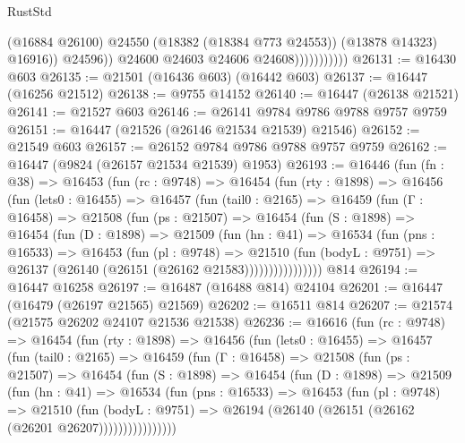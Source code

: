 \begin{lexlean}{RustStd}
\begin{coremodule}
                                  (@16884 @26100)
                                  @24550
                                  (@18382 (@18384 @773 @24553))
                                  (@13878 @14323)
                                  @16916))
                              @24596))
                          @24600
                          @24603
                          @24606
                          @24608)))))))))))
@26131 := @16430 @603
@26135 := @21501 (@16436 @603) (@16442 @603)
@26137 := @16447 (@16256 @21512)
@26138 := @9755 @14152
@26140 := @16447 (@26138 @21521)
@26141 := @21527 @603
@26146 := @26141 @9784 @9786 @9788 @9757 @9759
@26151 := @16447 (@21526 (@26146 @21534 @21539) @21546)
@26152 := @21549 @603
@26157 := @26152 @9784 @9786 @9788 @9757 @9759
@26162 := @16447 (@9824 (@26157 @21534 @21539) @1953)
@26193 := @16446
    (fun (fn : @38) =>
    @16453
      (fun (rc : @9748) =>
      @16454
        (fun (rty : @1898) =>
        @16456
          (fun (lets0 : @16455) =>
          @16457
            (fun (tail0 : @2165) =>
            @16459
              (fun (Γ : @16458) =>
              @21508
                (fun (ps : @21507) =>
                @16454
                  (fun (S : @1898) =>
                  @16454
                    (fun (D : @1898) =>
                    @21509
                      (fun (hn : @41) =>
                      @16534
                        (fun (pns : @16533) =>
                        @16453
                          (fun (pl : @9748) =>
                          @21510
                            (fun (bodyL : @9751) =>
                            @26137 (@26140 (@26151 (@26162 @21583))))))))))))))))
    @814
@26194 := @16447 @16258
@26197 := @16487 (@16488 @814) @24104
@26201 := @16447 (@16479 (@26197 @21565) @21569)
@26202 := @16511 @814
@26207 := @21574 (@21575 @26202 @24107 @21536 @21538)
@26236 := @16616
    (fun (rc : @9748) =>
    @16454
      (fun (rty : @1898) =>
      @16456
        (fun (lets0 : @16455) =>
        @16457
          (fun (tail0 : @2165) =>
          @16459
            (fun (Γ : @16458) =>
            @21508
              (fun (ps : @21507) =>
              @16454
                (fun (S : @1898) =>
                @16454
                  (fun (D : @1898) =>
                  @21509
                    (fun (hn : @41) =>
                    @16534
                      (fun (pns : @16533) =>
                      @16453
                        (fun (pl : @9748) =>
                        @21510
                          (fun (bodyL : @9751) =>
                          @26194 (@26140 (@26151 (@26162 (@26201 @26207))))))))))))))))

\end{coremodule}
\end{lexlean}
